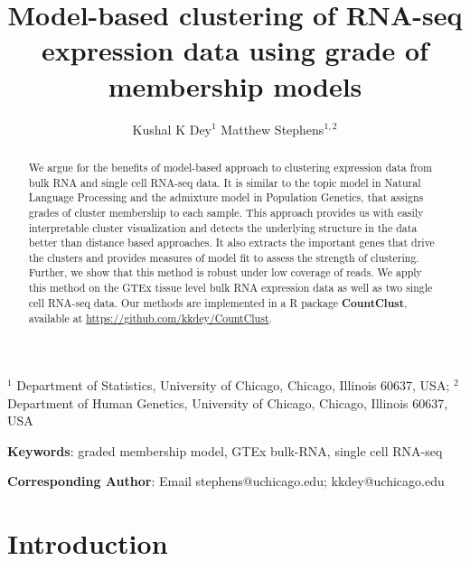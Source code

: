 \title{\Large{\textbf{Model-based clustering of RNA-seq expression data using grade of membership models}}}
\author{ Kushal K Dey$^{1}$  \qquad Matthew Stephens$^{1,2}$}

\maketitle

$^{1}$ Department of Statistics, University of Chicago, Chicago, Illinois 60637, USA;  $^{2}$ Department of Human Genetics, University of Chicago, Chicago, Illinois 60637, USA

\textbf{Keywords}: graded membership model, GTEx bulk-RNA, single cell RNA-seq

\textbf{Corresponding Author}: Email stephens@uchicago.edu; kkdey@uchicago.edu 
					      


\newpage

\begin{abstract}
We argue for the benefits of model-based approach to clustering expression data from bulk RNA and single cell RNA-seq data. It is similar to the topic model in Natural Language Processing and the admixture model in Population Genetics, that assigns grades of cluster membership to each sample. This approach provides us with easily interpretable cluster visualization  and  detects the underlying structure in the data better than distance based approaches. It also extracts the important genes that drive the clusters and provides measures of model fit to assess the strength of clustering. Further, we show that this method is robust under low coverage of reads. We apply this method on the GTEx tissue level bulk RNA expression data as well as two single cell RNA-seq data. Our methods are implemented in a R package \textbf{CountClust}, available at \url{https://github.com/kkdey/CountClust}.
\end{abstract}

\section{Introduction}

